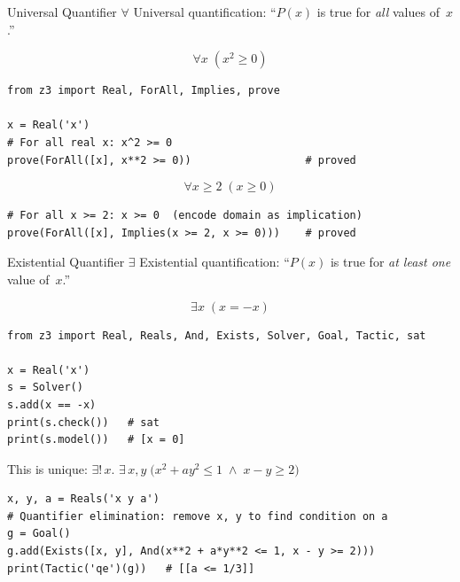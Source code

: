 \documentclass[aspectratio=169]{beamer}
\begin{document}
\begin{frame}[fragile]{Universal Quantifier $\boldsymbol{\forall}$}
  Universal quantification: ``$P(x)$ is true for \emph{all} values of~$x$.''

  \[
    \forall x\;(x^{2} \geq 0)
  \]

  \begin{lstlisting}[style=python]
from z3 import Real, ForAll, Implies, prove

x = Real('x')
# For all real x: x^2 >= 0
prove(ForAll([x], x**2 >= 0))                  # proved
  \end{lstlisting}

  \[
    \forall x \geq 2\;(x \geq 0)
  \]

  \begin{lstlisting}[style=python]
# For all x >= 2: x >= 0  (encode domain as implication)
prove(ForAll([x], Implies(x >= 2, x >= 0)))    # proved
  \end{lstlisting}
\end{frame}

\begin{frame}[fragile]{Existential Quantifier $\boldsymbol{\exists}$}
  Existential quantification: ``$P(x)$ is true for \emph{at least one} value of~$x$.''

  \[
    \exists x\;(x = -x)
  \]

  \begin{lstlisting}[style=python]
from z3 import Real, Reals, And, Exists, Solver, Goal, Tactic, sat

x = Real('x')
s = Solver()
s.add(x == -x)
print(s.check())   # sat
print(s.model())   # [x = 0]
  \end{lstlisting}

  This is unique: $\exists!\,x$. \quad
  $\exists\,x,y\;\bigl(x^{2}+ay^{2}\leq 1 \;\wedge\; x-y \geq 2\bigr)$

  \begin{lstlisting}[style=python]
x, y, a = Reals('x y a')
# Quantifier elimination: remove x, y to find condition on a
g = Goal()
g.add(Exists([x, y], And(x**2 + a*y**2 <= 1, x - y >= 2)))
print(Tactic('qe')(g))   # [[a <= 1/3]]
  \end{lstlisting}
\end{frame}
\end{document}
